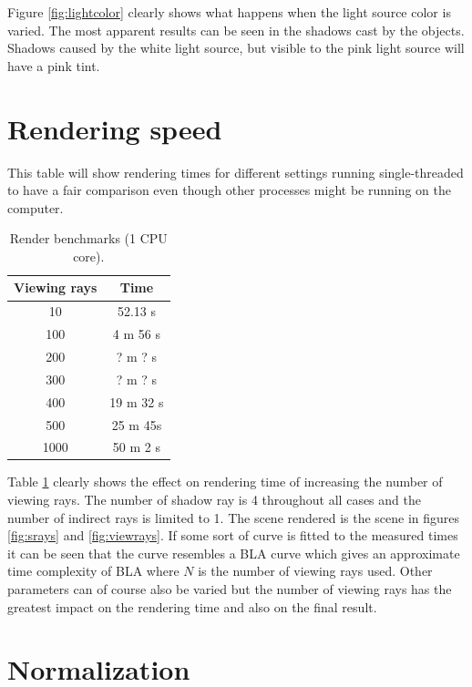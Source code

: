 \documentclass[a4paper]{report}
\begin{document}
Figure \ref{fig:lightcolor} clearly shows what happens when the light
source color is varied. The most apparent results can be seen in the
shadows cast by the objects. Shadows caused by the white light source,
but visible to the pink light source will have a pink tint.

\section{Rendering speed}

This table will show rendering times for different settings running
single-threaded to have a fair comparison even though other processes
might be running on the computer.

\begin{table}[htbp]
  \begin{center}
    \begin{tabular}{ | c | c | }
      \hline
      Viewing rays & Time \\
      \hline
      10   & 52.13 s \\
      100    & 4 m 56 s \\
      200    & ? m ? s \\
      300    & ? m ? s \\
      400    & 19 m 32 s \\
      500 & 25 m 45s \\
      1000  & 50 m 2 s  \\
      \hline
    \end{tabular}
    \caption{Render benchmarks (1 CPU core).}
    \label{tab:results}
  \end{center}
\end{table}

Table \ref{tab:results} clearly shows the effect on rendering time of increasing the
number of viewing rays. The number of shadow ray is 4 throughout all
cases and the number of indirect rays is limited to 1. The scene
rendered is the scene in figures \ref{fig:srays} and
\ref{fig:viewrays}. If some sort of curve is fitted to the measured
times it can be seen that the curve resembles a BLA curve which gives
an approximate time complexity of BLA where \(N\) is the number of
viewing rays used. Other parameters can of course also be varied but
the number of viewing rays has the greatest impact on the rendering
time and also on the final result.

\pagebreak

\section{Normalization}
\end{document}
